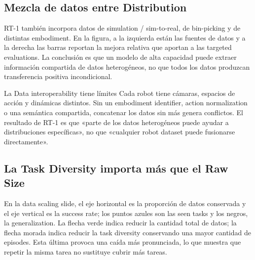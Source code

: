 
\subsection{Mezcla de datos entre Distribution}

RT-1 también incorpora datos de simulation / sim-to-real, de bin-picking y de distintas embodiment. En la figura, a la izquierda están las fuentes de datos y a la derecha las barras reportan la mejora relativa que aportan a las targeted evaluations. La conclusión es que un modelo de alta capacidad puede extraer información compartida de datos heterogéneos, no que todos los datos produzcan transferencia positiva incondicional.


\begin{warningbox}{La Data interoperability tiene límites}
Cada robot tiene cámaras, espacios de acción y dinámicas distintos. Sin un embodiment identifier, action normalization o una semántica compartida, concatenar los datos sin más genera conflictos. El resultado de RT-1 es que «parte de los datos heterogéneos puede ayudar a distribuciones específicas», no que «cualquier robot dataset puede fusionarse directamente».
\end{warningbox}

\subsection{La Task Diversity importa más que el Raw Size}

En la data scaling slide, el eje horizontal es la proporción de datos conservada y el eje vertical es la success rate; los puntos azules son las seen tasks y los negros, la generalization. La flecha verde indica reducir la cantidad total de datos; la flecha morada indica reducir la task diversity conservando una mayor cantidad de episodes. Esta última provoca una caída más pronunciada, lo que muestra que repetir la misma tarea no sustituye cubrir más tareas.

